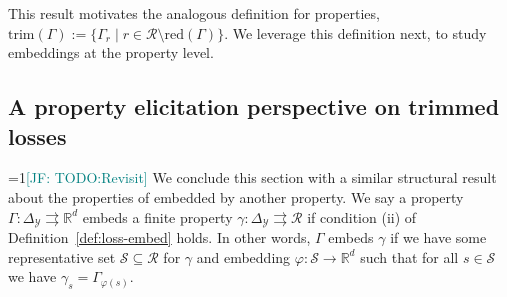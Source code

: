 \documentclass[11pt]{article}
\newcommand{\Comments}{1}
\newcommand{\mynote}[2]{\ifnum\Comments=1\textcolor{#1}{#2}\fi}
\newcommand{\jessie}[1]{\mynote{teal}{[JF: #1]}}
\newcommand{\reals}{\mathbb{R}}
\newcommand{\simplex}{\Delta_\Y}
\newcommand{\R}{\mathcal{R}}
\newcommand{\Sc}{\mathcal{S}}
\newcommand{\Y}{\mathcal{Y}}
\newcommand{\toto}{\rightrightarrows}
\newcommand{\red}{\mathrm{red}}
\newcommand{\trimred}{\mathrm{trim}}
\begin{document}
This result motivates the analogous definition for properties, $\trimred(\Gamma) := \{\Gamma_r \mid r \in \R\setminus\red(\Gamma)\}$.
We leverage this definition next, to study embeddings at the property level.

\subsection{A property elicitation perspective on trimmed losses}

\jessie{TODO:Revisit}
We conclude this section with a similar structural result about the properties of embedded by another property.
We say a property $\Gamma:\simplex\toto\reals^d$ embeds a finite property $\gamma:\simplex\toto\R$ if condition (ii) of Definition~\ref{def:loss-embed} holds.
In other words, $\Gamma$ embeds $\gamma$ if we have some representative set $\Sc\subseteq\R$ for $\gamma$ and embedding $\varphi:\Sc\to\reals^d$ such that for all $s\in\Sc$ we have $\gamma_s = \Gamma_{\varphi(s)}$.
\end{document}
